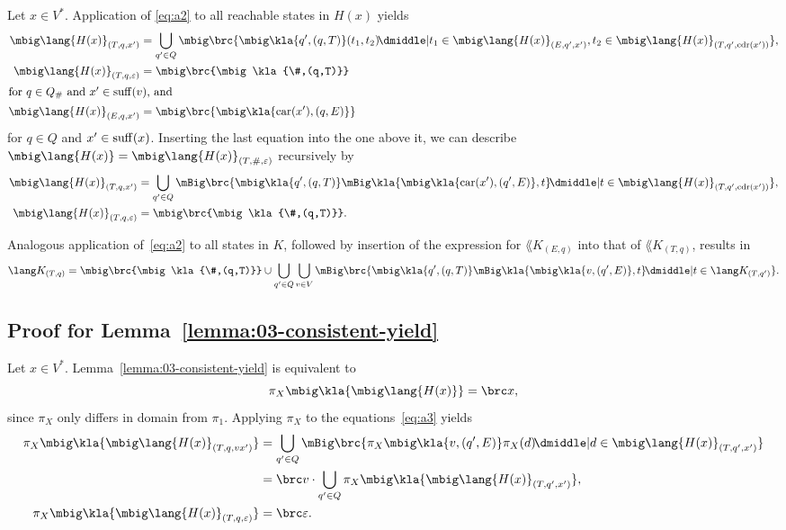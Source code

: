Let $x\in V^*$. Application of \eqref{eq:a2} to all reachable states in $H(x)$ yields
\begin{align*}
 \mbig\lang{H(x)}_{(T,q,x')} &= \bigcup_{q'\in Q}\mbig\brc{\mbig\kla{q',(q,T)}(t_1,t_2) \!\dmiddle| t_1\in\mbig\lang{H(x)}_{(E,q',x')}, t_2\in\mbig\lang{H(x)}_{(T,q',\cdr(x'))}}, \\
 \mbig\lang{H(x)}_{(T,q,\eps)} &= \mbig\brc{\mbig\kla{\#,(q,T)}} \\
 \intertext{for $q\in Q_\#$ and $x'\in\suff(v)$, and}
 \mbig\lang{H(x)}_{(E,q,x')} &= \mbig\brc{\mbig\kla{\car(x'),(q,E)}}
\end{align*}
for $q\in Q$ and $x'\in\operatorname{suff}(x)$. Inserting the last equation into the one above it, we can describe $\mbig\lang{H(x)} = \mbig\lang{H(x)}_{(T,\#,\eps)}$ recursively by
\begin{subequations}\label{eq:a3}\begin{align}
 \mbig\lang{H(x)}_{(T,q,x')} &= \bigcup_{q'\in Q}\mBig\brc{\mbig\kla{q',(q,T)}\mBig\kla{\mbig\kla{\car(x'),(q',E)},t} \!\dmiddle| t\in\mbig\lang{H(x)}_{(T,q',\cdr(x'))}}, \\
 \mbig\lang{H(x)}_{(T,q,\eps)} &= \mbig\brc{\mbig\kla{\#,(q,T)}}.
\end{align}\end{subequations}

Analogous application of~\eqref{eq:a2} to all states in $K$, followed by
insertion of the expression for $\lang K_{(E,q)}$ into that of $\lang
K_{(T,q)}$, results in
\begin{equation}\label{eq:a4}
 \lang K_{(T,q)} = \mbig\brc{\mbig\kla{\#,(q,T)}} \cup \bigcup_{q'\in Q}\bigcup_{v\in V}\mBig\brc{\mbig\kla{q',(q,T)}\mBig\kla{\mbig\kla{v,(q',E)},t} \!\dmiddle| t\in\lang K_{(T,q')}}.
\end{equation}

\subsection{Proof for Lemma~\ref{lemma:03-consistent-yield}}

Let $x\in V^*$. Lemma~\ref{lemma:03-consistent-yield} is equivalent to
\[
 \pi_X\mbig\kla{\mbig\lang{H(x)}} = \brc x,
\]
since $\pi_X$ only differs in domain from $\pi_1$. Applying $\pi_X$
to the equations~\eqref{eq:a3} yields
\begin{align*}
 \pi_X\mbig\kla{\mbig\lang{H(x)}_{(T,q,vx')}} &= \bigcup_{q'\in Q}\mBig\brc{\pi_X\mbig\kla{v,(q',E)}\pi_X(d) \!\dmiddle| d\in\mbig\lang{H(x)}_{(T,q',x')}} \\
 &= \brc v \cdot \bigcup_{q'\in Q} \pi_X\mbig\kla{\mbig\lang{H(x)}_{(T,q',x')}}, \\
 \pi_X\mbig\kla{\mbig\lang{H(x)}_{(T,q,\eps)}} &= \brc\eps.
\end{align*}

